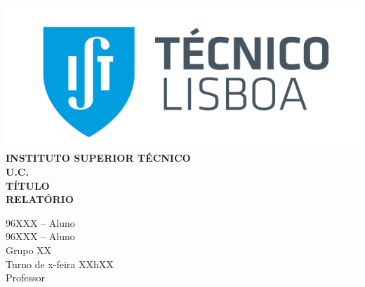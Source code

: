 \begin{titlepage}
    \setmainfont{Arial}
    \thispagestyle{date}
    \flushleft
    \includegraphics[scale = 0.3]{imagens/ist.png}\\[1.5 cm]
    \centering
    \textsc{\fontsize{18}{22}\textbf{INSTITUTO SUPERIOR TÉCNICO}}\\[2.6cm]
    \textsc{\fontsize{22}{27}\textbf{U.C.}}\\[1.5 cm]
    \textsc{\fontsize{23}{27}\textbf{TÍTULO}}\\[3.2 cm]
    \textsc{\fontsize{28}{34}\textbf{RELATÓRIO}}\\[5 cm]
    \begin{minipage}{0.5\textwidth}
        \quad
    \end{minipage}
    \setmainfont[Ligatures=TeX]{Arial.ttf}
    \begin{minipage}{0.49\textwidth}
        96XXX -- Aluno\\
        96XXX -- Aluno\\[1cm]
        Grupo XX\\
        Turno de x-feira XXhXX\\
        Professor
    \end{minipage}
\end{titlepage}